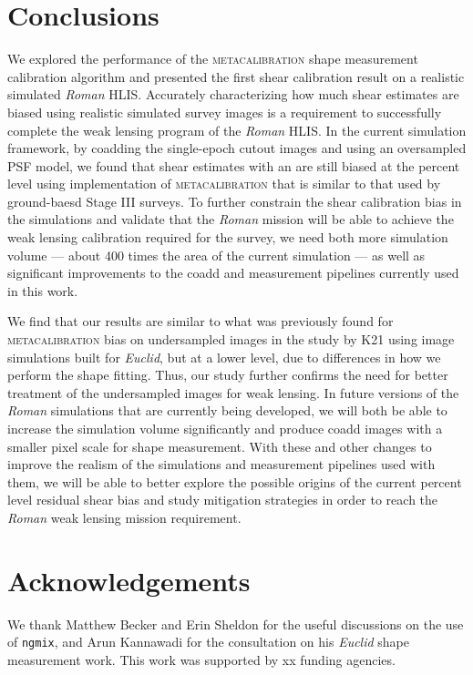\documentclass[fleqn,usenatbib]{mnras}
\begin{document}
\section{Conclusions}
We explored the performance of the \textsc{metacalibration} shape measurement calibration algorithm and presented the first shear calibration result on a realistic simulated \emph{Roman} HLIS. Accurately characterizing how much shear estimates are biased using realistic simulated survey images is a requirement to successfully complete the weak lensing program of the \emph{Roman} HLIS. In the current simulation framework, by coadding the single-epoch cutout images and using an oversampled PSF model, we found that shear estimates with an are still biased at the percent level using implementation of \textsc{metacalibration} that is similar to that used by ground-baesd Stage III surveys. To further constrain the shear calibration bias in the simulations and validate that the \emph{Roman} mission will be able to achieve the weak lensing calibration required for the survey, we need both more simulation volume --- about 400 times the area of the current simulation --- as well as significant improvements to the coadd and measurement pipelines currently used in this work. 

We find that our results are similar to what was previously found for \textsc{metacalibration} bias on undersampled images in the study by K21 using image simulations built for \emph{Euclid}, but at a lower level, due to differences in how we perform the shape fitting. Thus, our study further confirms the need for better treatment of the undersampled images for weak lensing. In future versions of the \emph{Roman} simulations that are currently being developed, we will both be able to increase the simulation volume significantly and produce coadd images with a smaller pixel scale for shape measurement. With these and other changes to improve the realism of the simulations and measurement pipelines used with them, we will be able to better explore the possible origins of the current percent level residual shear bias and study mitigation strategies in order to reach the \emph{Roman} weak lensing mission requirement. 
\label{sec:conclusion}



\section{Acknowledgements}

We thank Matthew Becker and Erin Sheldon for the useful discussions on the use of \texttt{ngmix}, and Arun Kannawadi for the consultation on his \emph{Euclid} shape measurement work. This work was supported by xx funding agencies.
\end{document}
